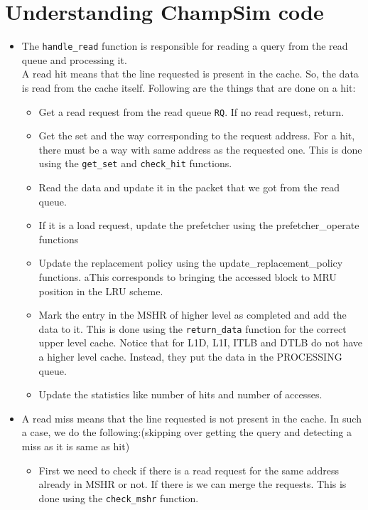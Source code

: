 \documentclass[11pt, swedish, openany]{book}
\begin{document}
\section{Understanding ChampSim code}
\begin{itemize}
    \item The \texttt{handle\_read} function is responsible for reading a query from the read queue and processing it.\\
          A read hit means that the line requested is present in the cache. So, the data is read from the cache itself. Following are the things that are done on a hit:
          \begin{itemize}
              \item Get a read request from the read queue \texttt{RQ}. If no read request, return.
              \item Get the set and the way corresponding to the request address. For a hit, there must be a way with same address as the requested one. This is done using the \texttt{get\_set} and \texttt{check\_hit} functions.
              \item Read the data and update it in the packet that we got from the read queue.
              \item If it is a load request, update the prefetcher using the prefetcher\_operate functions
              \item Update the replacement policy using the update\_replacement\_policy functions. aThis corresponds to bringing the accessed block to MRU position in the LRU scheme.
              \item Mark the entry in the MSHR of higher level as completed and add the data to it. This is done using the \texttt{return\_data} function for the correct upper level cache. Notice that for L1D, L1I, ITLB and DTLB do not have a higher level cache. Instead, they put the data in the PROCESSING queue.
              \item Update the statistics like number of hits and number of accesses.
          \end{itemize}
    \item A read miss means that the line requested is not present in the cache. In such a case, we do the following:(skipping over getting the query and detecting a miss as it is same as hit)
          \begin{itemize}
              \item First we need to check if there is a read request for the same address already in MSHR or not. If there is we can merge the requests. This is done using the \texttt{check\_mshr} function.

\end{itemize}
\end{itemize}
\end{document}
